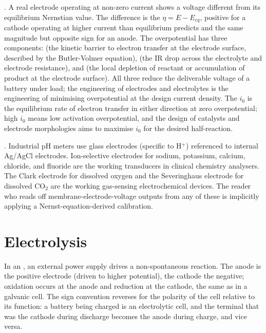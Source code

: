 . A real electrode operating at non-zero
current shows a voltage different from its equilibrium Nernstian
value. The difference is the  $\eta = E - E_{eq}$,
positive for a cathode operating at higher current than equilibrium
predicts and the same magnitude but opposite sign for an anode. The
overpotential has three components: 
(the kinetic barrier to electron transfer at the electrode surface,
described by the Butler-Volmer equation), 
(the IR drop across the electrolyte and electrode resistance), and
 (the local depletion of reactant
or accumulation of product at the electrode surface). All three reduce
the deliverable voltage of a battery under load; the engineering of
electrodes and electrolytes is the engineering of minimising
overpotential at the design current density. The  $i_0$ is the equilibrium rate of electron transfer
in either direction at zero overpotential; high $i_0$ means low
activation overpotential, and the design of catalysts and electrode
morphologies aims to maximise $i_0$ for the desired half-reaction.

. Industrial pH meters use
glass electrodes (specific to H$^+$) referenced to internal Ag/AgCl
electrodes. Ion-selective electrodes for sodium, potassium, calcium,
chloride, and fluoride are the working transducers in clinical
chemistry analysers. The Clark electrode for dissolved oxygen and
the Severinghaus electrode for dissolved CO$_2$ are the working
gas-sensing electrochemical devices. The reader who reads off
membrane-electrode-voltage outputs from any of these is implicitly
applying a Nernst-equation-derived calibration.

\section{Electrolysis}

In an , an external power supply drives a
non-spontaneous reaction. The anode is the positive electrode (driven
to higher potential), the cathode the negative; oxidation occurs at
the anode and reduction at the cathode, the same as in a galvanic cell.
The sign convention reverses for the polarity of the cell relative to
its function: a battery being charged is an electrolytic cell, and the
terminal that was the cathode during discharge becomes the anode during
charge, and vice versa.

